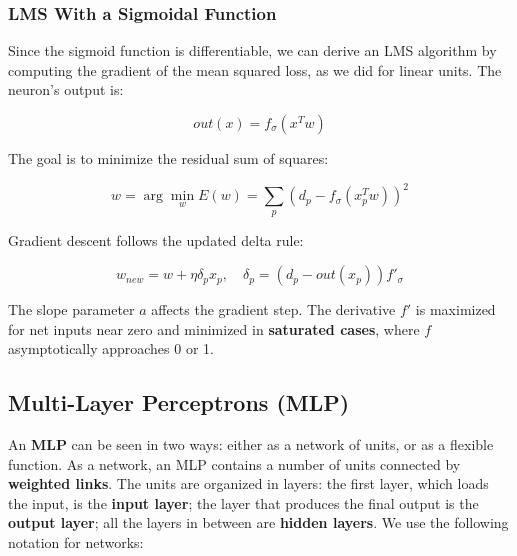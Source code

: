 \subsubsection{LMS With a Sigmoidal Function}
Since the sigmoid function is differentiable, we can derive an LMS algorithm by computing the gradient of the mean squared loss, as we did for linear units. The neuron's output is:

\begin{equation*}
    out(x) = f_{\sigma}(x^Tw)
\end{equation*}

The goal is to minimize the residual sum of squares:

\begin{equation*}
    w = \arg\min_w E(w) = \sum_p (d_p - f_{\sigma}(x_p^Tw))^2
\end{equation*}

Gradient descent follows the updated delta rule:

\begin{equation*}
    w_{new} = w + \eta \delta_p x_p, \quad \delta_p = (d_p - out(x_p)) f'_{\sigma}
\end{equation*}

The slope parameter \(a\) affects the gradient step. The derivative \( f' \) is maximized for net inputs near zero and minimized in \textbf{saturated cases}, where \( f \) asymptotically approaches 0 or 1.



\subsection{Multi-Layer Perceptrons (MLP)}

An \textbf{MLP} can be seen in two ways: either as a network of units, or as a flexible function. As a network, an MLP contains a number of units connected by \textbf{weighted links}. The units are organized in layers: the first layer, which loads the input, is the \textbf{input layer}; the layer that produces the final output is the \textbf{output layer}; all the layers in between are \textbf{hidden layers}. We use the following notation for networks:

